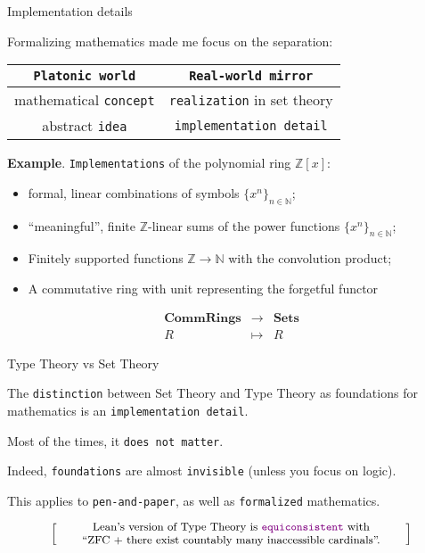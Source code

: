 \documentclass{beamer}
\begin{document}
\begin{frame}[fragile]{Implementation details}

Formalizing mathematics made me focus on the separation:

{\centering
\begin{tabular}{|c|c|}
\hline
{\color{violet}\verb`Platonic world`} &  {\color{violet}\verb`Real-world mirror`}  \\
\hline
mathematical {\color{violet}\verb`concept`} & {\color{violet}\verb`realization`} in set theory \\
abstract {\color{violet}\verb`idea`}        & {\color{violet}\verb`implementation detail`} \\
\hline
\end{tabular}

}

{\textbf{Example}}. {\color{violet}\verb`Implementations`} of the polynomial ring $\mathbb{Z}[x]$:
\\
\vspace{-13pt}
\begin{itemize}
\setlength\itemsep{-12pt}
\item
  formal, linear combinations of symbols $\{ x^n \}_{n \in \mathbb{N}}$;
\item
  ``meaningful'', finite $\mathbb{Z}$-linear sums of the power functions $\{ x^n \}_{n \in \mathbb{N}}$;
\item
  Finitely supported functions $\mathbb{Z} \to \mathbb{N}$ with the convolution product;
\item
  A commutative ring with unit representing the forgetful functor
\end{itemize}
$$
  \begin{array}{rcl}
    {\textbf{CommRings}} & \longrightarrow & {\textbf{Sets}} \\
    R & \longmapsto & R
  \end{array}
$$
\end{frame}

\begin{frame}[fragile]{Type Theory vs Set Theory}

The {\color{violet}\verb`distinction`} between Set Theory and Type Theory as foundations for mathematics is an {\color{violet}\verb`implementation detail`}.

Most of the times, it {\color{violet}\verb`does not matter`}.

Indeed, {\color{violet}\verb`foundations`} are almost {\color{violet}\verb`invisible`} (unless you focus on logic).

This applies to {\color{violet}\verb`pen-and-paper`}, as well as {\color{violet}\verb`formalized`} mathematics.

\[
  \left[ \;
  \parbox{0.8\textwidth}{\centering\small
  Lean's version of Type Theory is {\color{violet}\texttt{equiconsistent}} with \\``ZFC + there exist countably many inaccessible cardinals''.
  }
  \; \right]
\]
\end{frame}
\end{document}

